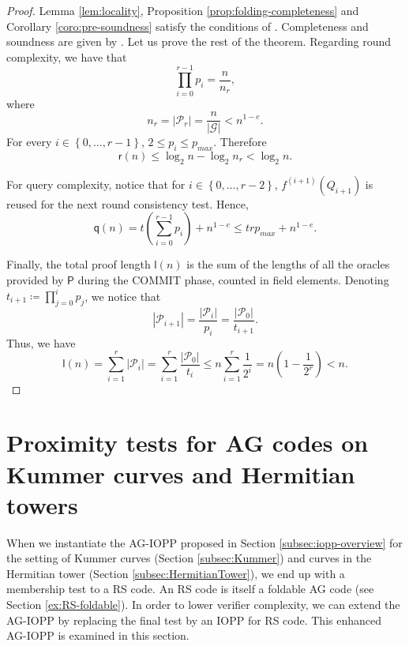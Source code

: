 \documentclass[a4paper,USenglish,autoref]{lipics-v2021}
\newcommand\prover{\mathsf{P}}
\newcommand{\set}[1]{\left\{#1\right\}}
\newcommand{\size}[1]{\left|#1\right|}
\newcommand{\range}[1]{\set{0,\dots,#1-1}}
\newcommand{\Range}[2]{\set{#1,\dots,#2}}
\newcommand\calP{\mathcal{P}}
\newcommand\calG{\mathcal{G}}
\newcommand\xpip[1]{#1^{(i+1)}}
\newcommand\mydef{\coloneqq}
\begin{document}
\begin{proof} Lemma \ref{lem:locality}, Proposition \ref{prop:folding-completeness} and Corollary \ref{coro:pre-soundness} satisfy the conditions of \cite[Theorem~1]{ABN21}. Completeness and soundness are given by \cite[Theorem~1]{ABN21}. Let us prove the rest of the theorem.  
	Regarding round complexity, we have that \[\prod_{i = 0}^{r-1} p_i = \frac{n}{n_r},\] where \[n_r = \size{\calP_r} = \frac{n}{\size{\calG}} < n^{1 - e}.\] For every $i \in \range{r}$, $2 \le p_i \le p_{max}$. Therefore \[\mathsf{r}(n) \le \log_2 n - \log_2 n_r < \log_2 n.\]  
	
	For query complexity, notice that for $i \in \Range{0}{r-2}$, $\xpip{f}(Q_{i+1})$ is reused for the next round consistency test.  Hence, \[\mathsf{q}(n) = t \left(\sum_{i = 0}^{r-1} p_i\right) + n^{1 - e} \le t r p_{max} + n^{1 - e}.\]
	
	
	Finally, the total proof length $\mathsf{l}(n)$ is the sum of the lengths of all the oracles provided by $\prover$ during the \textsf{COMMIT} phase, counted in field elements. Denoting $t_{i+1} \mydef \prod_{j = 0}^{i} p_j$, we notice that \[\size{\calP_{i+1}} = \frac{\size{\calP_i}}{p_i} = \frac{\size{\calP_0}}{t_{i+1}}.\] Thus, we have
	\[\mathsf{l}(n) = \sum_{i = 1}^{r}\size{\calP_{i}} = \sum_{i = 1}^{r} \frac{\size{\calP_0}}{t_i} \le n \sum_{i = 1}^{r} \frac{1}{2^{i}} = n \left(1 - \frac{1}{2^r}\right) < n.\]      
\end{proof}

\section{Proximity tests for AG codes on Kummer curves and Hermitian towers}\label{sec:kummer-iopp}

When we instantiate the AG-IOPP proposed in Section \ref{subsec:iopp-overview} for the setting of Kummer curves (Section \ref{subsec:Kummer}) and curves in the Hermitian tower (Section \ref{subsec:HermitianTower}), we end up with a membership test to a RS code. An RS code is itself a foldable AG code (see Section \ref{ex:RS-foldable}). In order to lower verifier complexity, we can extend the AG-IOPP by replacing the final test by an IOPP for RS code. This enhanced AG-IOPP is examined in this section.
\end{document}
